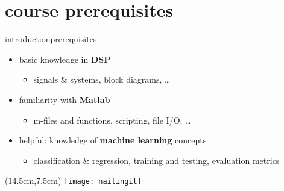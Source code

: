    \section[course prerequisites]{course prerequisites}
        \begin{frame}{introduction}{prerequisites}
            \begin{itemize}
                \item   basic knowledge in \textbf{DSP}
                    \begin{itemize}
                        \item signals \& systems, block diagrams, \ldots
                    \end{itemize}
                \bigskip
                \item	familiarity with \textbf{Matlab} 
                    \begin{itemize}
                        \item   m-files and functions, scripting, file I/O, \ldots
                    \end{itemize}
                \bigskip
                \item	helpful: knowledge of \textbf{machine learning} concepts
                    \begin{itemize}
                        \item   classification \& regression, training and testing, evaluation metrics
                    \end{itemize}
            \end{itemize}
            \begin{textblock*}{100mm}(14.5cm,7.5cm)
                \texttt{[image: nailingit]}
            \end{textblock*}
        \end{frame}

